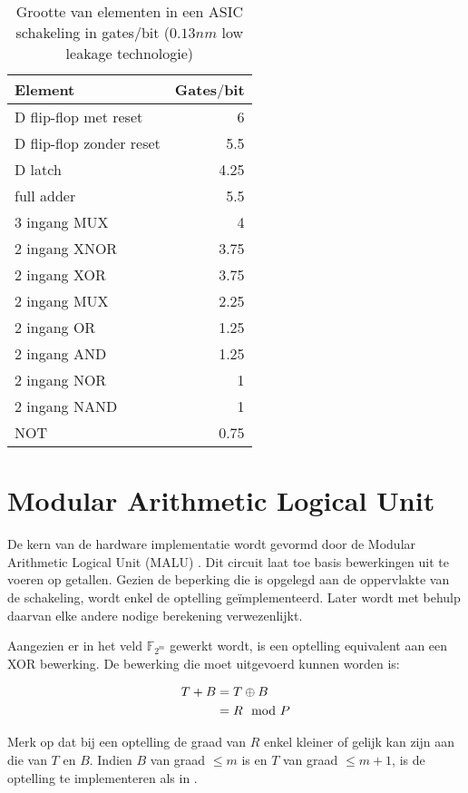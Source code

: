 \begin{table}[h]
	\caption{Grootte van elementen in een ASIC schakeling in gates$/$bit ($0.13 nm$ low leakage technologie)\cite{cell-databook}}
	\label{tabel-implementatie-beperkingen-elementen-gatecount}
	\begin{tabular}{|l|r|}
		\hline
		Element			& Gates$/$bit\\
		\hline
		D flip-flop met reset	& 6\\
		D flip-flop zonder reset	& 5.5\\
		D latch			& 4.25\\
		full adder		& 5.5\\
		3 ingang MUX	& 4\\
		2 ingang XNOR	& 3.75\\
		2 ingang XOR	& 3.75\\
		2 ingang MUX	& 2.25\\
		2 ingang OR		& 1.25\\
		2 ingang AND	& 1.25\\
		2 ingang NOR	& 1\\
		2 ingang NAND	& 1\\
		NOT				& 0.75\\
		\hline		
	\end{tabular}
\end{table}

\section{Modular Arithmetic Logical Unit\label{sectie-implementatie-malu}}

De kern van de hardware implementatie wordt gevormd door de Modular Arithmetic Logical Unit (MALU) \cite{sakiyama}\cite{batina-lowcost}. Dit circuit laat toe basis bewerkingen uit te voeren op getallen. Gezien de beperking die is opgelegd aan de oppervlakte van de schakeling, wordt enkel de optelling ge\"implementeerd. Later wordt met behulp daarvan elke andere nodige berekening verwezenlijkt.

Aangezien er in het veld $\mathbb{F}_{2^m}$ gewerkt wordt, is een optelling equivalent aan een XOR bewerking. De bewerking die moet uitgevoerd kunnen worden is:

\[\begin{aligned}
T + B	&= T \oplus B\\
		&= R \mod P
\end{aligned}\]

Merk op dat bij een optelling de graad van $R$ enkel kleiner of gelijk kan zijn aan die van $T$ en $B$. Indien $B$ van graad $\leq m$ is en $T$ van graad $\leq m + 1$, is de optelling te implementeren als in .

